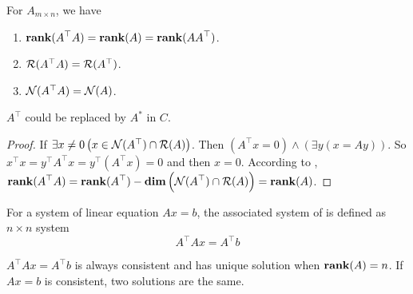 \begin{theorem}\label{rankofadjoint}
    For $A_{m \times n}$, we have
    \begin{enumerate}
        \item $\displaystyle \mathbf{rank}( A^\top A ) = \displaystyle \mathbf{rank}( A ) = \displaystyle \mathbf{rank}( A A^\top )$.
        \item $\mathcal{R}(A^\top A) = \mathcal{R}(A^\top)$.
        \item $\mathcal{N}(A^\top A) = \mathcal{N}(A)$.
    \end{enumerate}
    $A^\top$ could be replaced by $A^*$ in $C$.
\end{theorem}
\begin{proof}
    If $\exists x \neq 0 \left(x \in \mathcal{N}(A^\top) \cap \mathcal{R}(A) \right)$. Then $(A^\top x = 0) \wedge \left(\exists y(x = A y) \right)$. So $x^\top x = y^\top A^\top x = y^\top ( A^\top x) = 0 $ and then $x =0$. According to , $\displaystyle \mathbf{rank}( A^\top A ) = \displaystyle \mathbf{rank}( A^\top ) - \displaystyle \mathbf{dim}\left( \mathcal{N}(A^\top) \cap \mathcal{R}(A) \right) = \displaystyle \mathbf{rank}( A )$.
\end{proof}

\begin{theorem}
    For a system of linear equation $Ax = b$, the associated system of  is defined as $n \times n$ system
    \begin{equation}
        A^\top A x = A^\top b
    \end{equation}
    
    $A^\top A x = A^\top b$ is always consistent and has unique solution when $\displaystyle \mathbf{rank}( A ) = n$. If $Ax=b$ is consistent, two solutions are the same.
\end{theorem}



